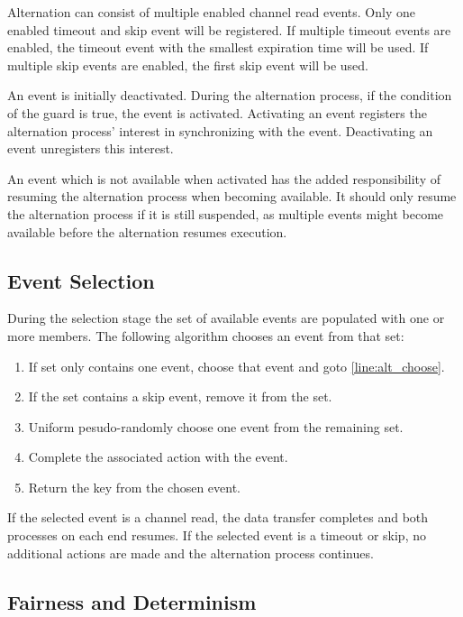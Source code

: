 Alternation can consist of multiple enabled channel read events. Only one enabled timeout and skip event will be registered. If multiple timeout events are enabled, the timeout event with the smallest expiration time will be used. If multiple skip events are enabled, the first skip event will be used. 

An event is initially deactivated. During the alternation process, if the condition of the guard is true, the event is activated. Activating an event registers the alternation process' interest in synchronizing with the event. Deactivating an event unregisters this interest. 

An event which is not available when activated has the added responsibility of resuming the alternation process when becoming available. It should only resume the alternation process if it is still suspended, as multiple events might become available before the alternation resumes execution.

\subsection{Event Selection}
\label{subsec:alternation_fairness}

During the selection stage the set of available events are populated with one or more members. The following algorithm chooses an event from that set:

\begin{enumerate}[topsep=0em,itemsep=-1em,partopsep=0.5em,parsep=1em]
    \item If set only contains one event, choose that event and goto \ref{line:alt_choose}.
    \item If the set contains a skip event, remove it from the set.
    \item Uniform pesudo\hyp{}randomly choose one event from the remaining set. 
    \item Complete the associated action with the event. \label{line:alt_choose}
    \item Return the key from the chosen event.
\end{enumerate}

If the selected event is a channel read, the data transfer completes and both processes on each end resumes. If the selected event is a timeout or skip, no additional actions are made and the alternation process continues. 

\subsection{Fairness and Determinism}

